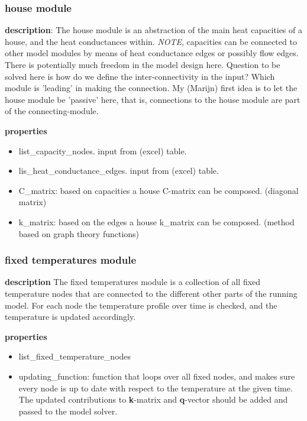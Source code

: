 \subsubsection{house module}
\textbf{description}: The house module is an abstraction of the main heat capacities of a house, and the heat conductances within. \emph{NOTE}, capacities can be connected to other model modules by means of heat conductance edges or possibly flow edges. There is potentially much freedom in the model design here. Question to be solved here is how do we define the inter-connectivity in the input? Which module is 'leading' in making the connection. My (Marijn) first idea is to let the house module be 'passive' here, that is, connections to the house module are part of the connecting-module.    

\textbf{properties}
\begin{itemize}
	\item list\_capacity\_nodes. input from (excel) table.
	\item lis\_heat\_conductance\_edges. input from (excel) table.
	\item C\_matrix: based on capacities a house C-matrix can be composed. (diagonal matrix)
	\item k\_matrix: based on the edges a house k\_matrix can be composed. (method based on graph theory functions)
\end{itemize}


\subsubsection{fixed temperatures module}
\textbf{description} The fixed temperatures module is a collection of all fixed temperature nodes that are connected to the different other parts of the running model. For each node the temperature profile over time is checked, and the temperature is updated accordingly. 

\textbf{properties}
\begin{itemize}
	\item list\_fixed\_temperature\_nodes
	\item updating\_function: function that loops over all fixed nodes, and makes sure every node is up to date with respect to the temperature at the given time. The updated contributions to \textbf{k}-matrix and \textbf{q}-vector should be added and passed to the model solver. 
\end{itemize}


